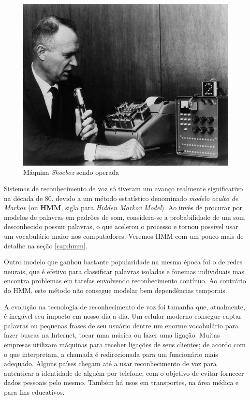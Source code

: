 \begin{figure}[H]
  \centering
  \includegraphics[width=.5\textwidth]{image/shoebox.jpg}
  \caption{Máquina \textit{Shoebox} sendo operada}
  \label{shoebox}
\end{figure}

Sistemas de reconhecimento de voz só tiveram um avanço realmente significativo na década de 80, devido a um método estatístico denominado \emph{modelo oculto de Markov} (ou \textbf{HMM}, sigla para \textit{Hidden Markov Model}). Ao invés de procurar por modelos de palavras em padrões de som, considera-se a probabilidade de um som desconhecido possuir palavras, o que acelerou o processo e tornou possível usar um vocabulário maior nos computadores. Veremos HMM com um pouco mais de detalhe na seção \ref{cap:hmm}.

Outro modelo que ganhou bastante popularidade na mesma época foi o de redes neurais, que é efetivo para classificar palavras isoladas e fonemas individuais mas encontra problemas em tarefas envolvendo reconhecimento contínuo. Ao contrário do HMM, este método não consegue modelar bem dependências temporais.

A evolução na tecnologia de reconhecimento de voz foi tamanha que, atualmente, é inegável seu impacto em nosso dia a dia. Um celular moderno consegue captar palavras ou pequenas frases de seu usuário dentre um enorme vocabulário para fazer buscas na Internet, tocar uma música ou fazer uma ligação. Muitas empresas utilizam máquinas para receber ligações de seus clientes; de acordo com o que interpretam, a chamada é redirecionada para um funcionário mais adequado. Alguns países chegam até a usar reconhecimento de voz para autenticar a identidade de alguém por telefone, com o objetivo de evitar fornecer dados pessoais pelo mesmo. Também há usos em transportes, na área médica e para fins educativos.


